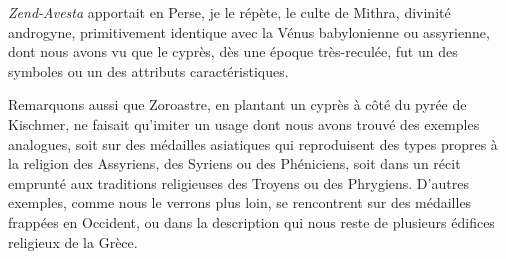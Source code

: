 \documentclass{article}
\begin{document}
\emph{Zend-Avesta} apportait en Perse, je le répète, le culte de Mithra, divinité androgyne, primitivement identique avec la Vénus babylonienne ou assyrienne, dont nous avons vu que le cyprès, dès une époque très-reculée, fut un des symboles ou un des attributs caractéristiques.

Remarquons aussi que Zoroastre, en plantant un cyprès à côté du pyrée de Kischmer, ne faisait qu'imiter un usage dont nous avons trouvé des exemples analogues, soit sur des médailles asiatiques qui reproduisent des types propres à la religion des Assyriens, des Syriens ou des Phéniciens, soit dans un récit emprunté aux traditions religieuses des Troyens ou des Phrygiens. D'autres exemples, comme nous le verrons plus loin, se rencontrent sur des médailles frappées en Occident, ou dans la description qui nous reste de plusieurs édifices religieux de la Grèce.
\end{document}
